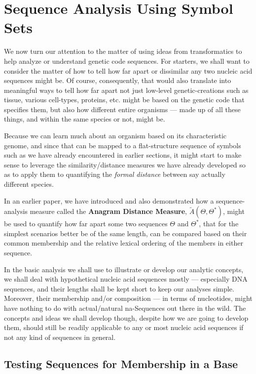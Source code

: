 \documentclass[a4paper, 18pt]{book} %
\begin{document}
\chapter{Sequence Analysis Using Symbol Sets}
\label{SEC3}


We now turn our attention to the matter of using ideas from transformatics to help analyze or understand genetic code sequences. For starters, we shall want to consider the matter of how to tell how far apart or dissimilar any two nucleic acid sequences might be. Of course, consequently, that would also translate into meaningful ways to tell how far apart not just low-level genetic-creations such as tissue, various cell-types, proteins, etc. might be based on the genetic code that specifies them, but also how different entire organisms --- made up of all these things, and within the same species or not, might be.

Because we can learn much about an organism based on its characteristic genome, and since that can be mapped to a flat-structure sequence of symbols such as we have already encountered in earlier sections, it might start to make sense to leverage the similarity/distance measures we have already developed so as to apply them to quantifying the \textit{formal distance} between say actually different species. 

In an earlier paper\cite{adtpaper}, we have introduced and also demonstrated how a sequence-analysis measure called the \textbf{Anagram Distance Measure}, $\tilde{A}(\Theta,\Theta^*)$, might be used to quantify how far apart some two sequences $\Theta$ and $\Theta^*$, that for the simplest scenarios better be of the same length, can be compared based on their common membership and the relative lexical ordering of the members in either sequence.

In the basic analysis we shall use to illustrate or develop our analytic concepts, we shall deal with hypothetical nucleic acid sequences mostly --- especially DNA sequences, and their lengths shall be kept short to keep our analyses simple. Moreover, their membership and/or composition --- in terms of nucleotides, might have nothing to do with actual/natural na-Sequences out there in the wild. The concepts and ideas we shall develop though, despite how we are going to develop them, should still be readily applicable to any or most nucleic acid sequences if not any kind of sequences in general.


\section{Testing Sequences for Membership in a Base}
\end{document}
